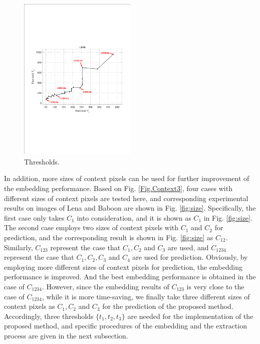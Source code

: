 \documentclass[review,3p,10pt,sort&compress]{elsarticle}
\begin{document}
\begin{figure}
\centering
\includegraphics[width=0.5\textwidth]{figures/Thresholds.pdf}
\centering
\caption{Thresholds.}
\label{Fig.Thresholds}
\end{figure}

In addition, more sizes of context pixels can be used for further improvement of the embedding performance. Based on Fig. \ref{Fig.Context3}, four cases with different sizes of context pixels are tested here, and corresponding experimental results on images of Lena and Baboon are shown in Fig. \ref{fig:size}. Specifically, the first case only takes $C_1$ into consideration, and it is shown as $C_1$ in Fig. \ref{fig:size}. The second case employs two sizes of context pixels with $C_1$ and $C_2$ for prediction, and the corresponding result is shown in Fig. \ref{fig:size} as $C_{12}$. Similarly, $C_{123}$ represent the case that $C_1, C_2$ and $C_3$ are used, and $C_{1234}$ represent the case that $C_1, C_2, C_3$ and $C_4$ are used for prediction. Obviously, by employing more different sizes of context pixels for prediction, the embedding performance is improved. And the best embedding performance is obtained in the case of $C_{1234}$. However, since the embedding results of $C_{123}$ is very close to the case of $C_{1234}$, while it is more time-saving, we finally take three different sizes of context pixels as $C_1, C_2$ and $C_3$ for the prediction of the proposed method. Accordingly, three thresholds $\{t_1, t_2, t_3\}$ are needed for the implementation of the proposed method, and specific procedures of the embedding and the extraction process are given in the next subsection.
\end{document}
